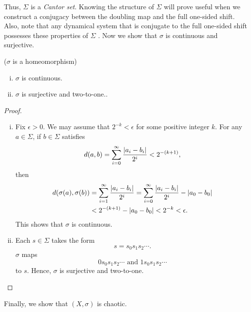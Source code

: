 \documentclass[10pt,twoside]{book}
\begin{document}
Thus, $\Sigma$ is a \textit{Cantor set}.
Knowing the structure of $\Sigma$ will prove useful when we construct a conjugacy between the doubling map and the full one-sided shift.
Also, note that any dynamical system that is conjugate to the full one-sided shift possesses these properties of $\Sigma$ \citep{dugundji}.
Now we show that $\sigma$ is continuous and surjective.
\begin{proposition}
  ($\sigma$ is a homeomorphism)
  \begin{enumerate}[(i)]
    \item $\sigma$ is continuous.
    \item  $\sigma$ is surjective and two-to-one..
  \end{enumerate}
  \begin{proof}
    \begin{enumerate}[(i)]
      \item 
        Fix $\epsilon > 0$.
        We may assume that $2^{-k} < \epsilon$ for some positive integer $k$.
        For any $a \in \Sigma$, if $b \in \Sigma$ satisfies
        \begin{equation*}
          d(a,b) = \sum\limits_{i=0}^{\infty} \frac{\left | a_i - b_i \right |}{2^i} < 2^{-(k+1)},
        \end{equation*}
        then 
        \begin{align*}
          d(\sigma(a), \sigma(b)) 
          &= \sum\limits_{i=1}^{\infty} \frac{\left | a_i - b_i \right |}{2^i} 
          = \sum\limits_{i=0}^{\infty} \frac{\left | a_i - b_i \right |}{2^i} - \left | a_0 - b_0 \right |  \\
          &< 2^{-(k+1)} - \left | a_0 - b_0 \right |
          < 2^{-k}
          < \epsilon.
        \end{align*}
        This shows that $\sigma$ is continuous.
      \item  
        Each $s \in \Sigma$ takes the form
        \begin{equation*}
          s = s_0s_1s_2 \cdots.
        \end{equation*}
        $\sigma$ maps
        \begin{equation*}
          0 s_0s_1s_2 \cdots \mbox{ and } 1 s_0s_1s_2 \cdots
        \end{equation*}
        to $s$.
        Hence, $\sigma$ is surjective and two-to-one.
    \end{enumerate}
  \end{proof}
  \label{prop:sigma-cont}
\end{proposition}
Finally, we show that $(X,\sigma)$ is chaotic.
\end{document}
